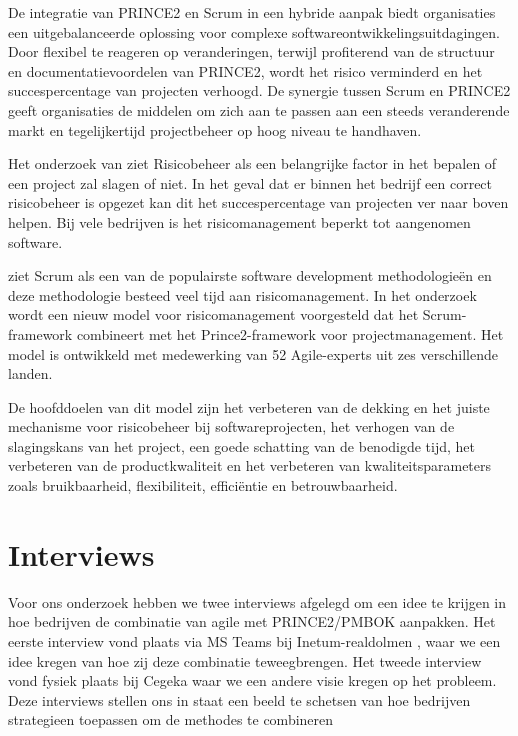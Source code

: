 \documentclass[dutch]{hogent-article}
\begin{document}
De integratie van PRINCE2 en Scrum in een hybride aanpak biedt organisaties een uitgebalanceerde oplossing voor complexe softwareontwikkelingsuitdagingen. Door flexibel te reageren op veranderingen, terwijl profiterend van de structuur en documentatievoordelen van PRINCE2, wordt het risico verminderd en het succespercentage van projecten verhoogd. De synergie tussen Scrum en PRINCE2 geeft organisaties de middelen om zich aan te passen aan een steeds veranderende markt en tegelijkertijd projectbeheer op hoog niveau te handhaven.
\newline

Het onderzoek van \textcite{Mousaei2018} ziet Risicobeheer als een belangrijke factor in het bepalen of een project zal slagen of niet. In het geval dat er binnen het bedrijf een correct risicobeheer is opgezet kan dit het succespercentage van projecten ver naar boven helpen. Bij vele bedrijven is het risicomanagement beperkt tot aangenomen software.
\newline 

\textcite{Mousaei2018} ziet Scrum als een van de populairste software development methodologieën en deze methodologie besteed veel tijd aan risicomanagement. In het onderzoek wordt een nieuw model voor risicomanagement voorgesteld dat het Scrum-framework combineert met het Prince2-framework voor projectmanagement. Het model is ontwikkeld met medewerking van 52 Agile-experts uit zes verschillende landen.
\newline

 De hoofddoelen van dit model zijn het verbeteren van de dekking en het juiste mechanisme voor risicobeheer bij softwareprojecten, het verhogen van de slagingskans van het project, een goede \linebreak schatting  van de benodigde tijd, het verbeteren van de productkwaliteit en het verbeteren van \linebreak kwaliteitsparameters zoals bruikbaarheid, flexibiliteit, efficiëntie en betrouwbaarheid.

\section{Interviews}
\label{sec:interviews}
Voor ons onderzoek hebben we twee interviews afgelegd om een idee te krijgen
in hoe bedrijven de combinatie van agile met PRINCE2/PMBOK aanpakken.
Het eerste interview vond plaats via MS Teams bij Inetum-realdolmen
, waar we een idee kregen van hoe zij deze combinatie teweegbrengen. Het tweede interview vond fysiek plaats
bij Cegeka waar we een andere visie kregen op het probleem. Deze interviews stellen ons in staat een beeld te schetsen van hoe bedrijven strategieen toepassen om de methodes te combineren
\end{document}
